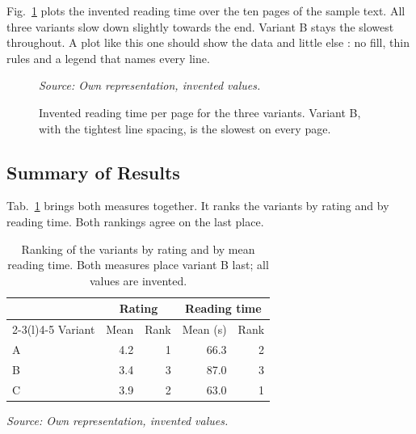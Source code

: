 \documentclass[11pt,a4paper]{article}
\newcommand{\srcnote}[2][\linewidth]{%
  {\setlength{\parskip}{0pt}\par\nobreak\vspace{6pt}%
   \noindent\parbox{#1}{\raggedright\itshape\fontsize{10}{12}\selectfont Source: #2}\par}}
\renewcommand{\arraystretch}{1.1}
\newcommand{\tablefontsize}{\fontsize{9}{10.5}\selectfont
  \renewcommand{\arraystretch}{1.0}\setlength{\tabcolsep}{6pt}}
\renewcommand{\footnotesize}{\fontsize{10}{12}\selectfont}
\begin{document}
Fig.~\ref{fig:time} plots the invented reading time over the ten pages of
the sample text. All three variants slow down slightly towards the end.
Variant B stays the slowest throughout. A plot like this one should show the
data and little else \parencite[p.~93]{tufte2001}: no fill, thin rules and a
legend that names every line.

\begin{figure}[H]
  \centering
  \caption{Invented reading time per page for the three variants. Variant B,
  with the tightest line spacing, is the slowest on every page.}
  \label{fig:time}
  \srcnote{Own representation, invented values.}
\end{figure}

\subsection{Summary of Results}

Tab.~\ref{tab:summary} brings both measures together. It ranks the variants
by rating and by reading time. Both rankings agree on the last place.

\begin{table}[H]
  \centering
  \caption{Ranking of the variants by rating and by mean reading time. Both
  measures place variant B last; all values are invented.}
  \label{tab:summary}
  {\tablefontsize
  \begin{tabular}{@{}lrrrr@{}}
    \toprule
    & \multicolumn{2}{c}{Rating} & \multicolumn{2}{c}{Reading time} \\
    \cmidrule(lr){2-3}\cmidrule(l){4-5}
    Variant & Mean & Rank & Mean (s) & Rank \\
    \midrule
    A & 4.2 & 1 & 66.3 & 2 \\
    B & 3.4 & 3 & 87.0 & 3 \\
    C & 3.9 & 2 & 63.0 & 1 \\
    \bottomrule
  \end{tabular}}
  \srcnote{Own representation, invented values.}
\end{table}
\end{document}
